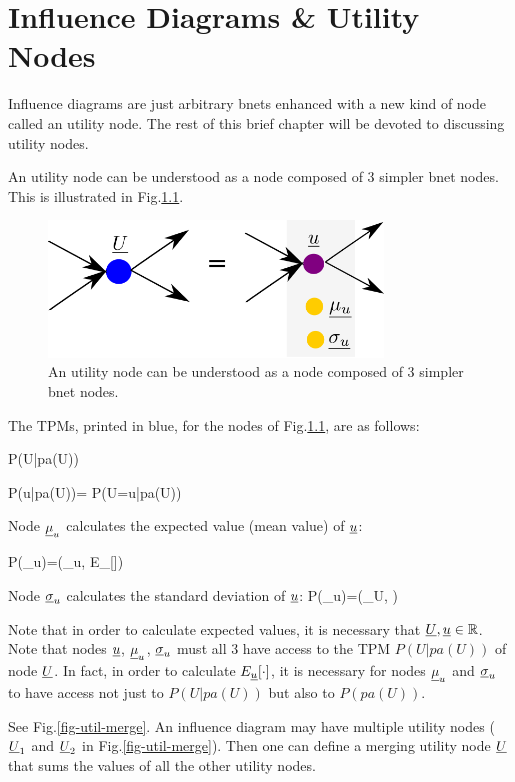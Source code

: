 \chapter{Influence Diagrams \& Utility Nodes}
\label{ch-inf-dia}

Influence diagrams are
just arbitrary bnets
enhanced with a 
new kind of node called an utility node.
The rest
of this brief chapter  will 
be devoted to discussing utility nodes.

An utility node
can be
understood
as a node
composed of 3 simpler bnet nodes.
This
is illustrated in Fig.\ref{fig-util-node}.

\begin{figure}[h!]
\centering
\includegraphics[width=3.5in]
{inf-dia/util-node.png}
\caption{An utility node
can be
understood
as a node 
composed of 3 simpler bnet nodes.} 
\label{fig-util-node}
\end{figure}

The TPMs,
printed in blue,
for the nodes
of Fig.\ref{fig-util-node},
are as follows:

\beq\color{blue}
P(U|pa(U))
\eeq

\beq\color{blue}
P(u|pa(U))=
P(U=u|pa(U))
\eeq

Node $\underline{\mu}_u$
calculates the
expected value (mean value) of ${\underline{u}}$:

\beq\color{blue}
P(\mu_u)=\delta(\mu_u,
E_{\rvu}[\rvu])
\eeq

Node $\underline{\sigma}_u$
calculates the
standard deviation of ${\underline{u}}$:
\beq\color{blue}
P(\sigma_u)=\delta(\sigma_U,
)
\eeq

Note that in order to
calculate expected values,
it is necessary that
${\underline{U}}, {\underline{u}}\in { \mathbb{R}}$. Note that
nodes ${\underline{u}}$, $\underline{\mu}_u$, $\underline{\sigma}_u$
must all 3 have access
to the 
TPM
$P(U|pa(U))$ of node ${\underline{U}}$.
In fact, in order  to
calculate $E_{\underline{u}}[\cdot]$,
it is necessary for
nodes $\underline{\mu}_u$ and 
 $\underline{\sigma}_u$
to have access not just to 
$P(U|pa(U))$ but also to
$P(pa(U))$.

See Fig.\ref{fig-util-merge}.
An influence
diagram may have multiple
utility nodes (${\underline{U}}_1$ and
${\underline{U}}_2$ in Fig.\ref{fig-util-merge}).
Then one can define a merging
utility node ${\underline{U}}$ that sums
the values of
all the other utility 
nodes.

